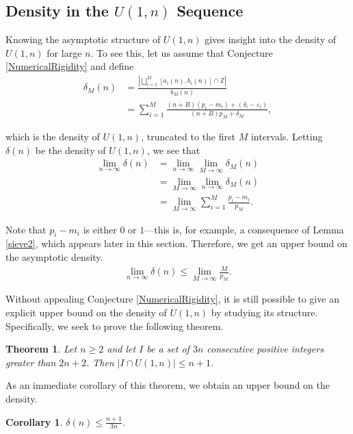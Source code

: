 \documentclass{amsart}
\newcommand{\ZZ}{\mathbb{Z}}
\theoremstyle{theorem}
\newtheorem{theorem}{Theorem}[section]
\newtheorem{corollary}{Corollary}[section]
\theoremstyle{definition}
\begin{document}
\subsection{Density in the $U(1,n)$ Sequence} Knowing the asymptotic structure of $U(1,n)$ gives insight into the density of $U(1,n)$ for large $n$. To see this, let us assume that Conjecture \ref{NumericalRigidity} and define
	\begin{align*}
    \delta_M(n) &= \frac{\left|\bigsqcup_{i = 1}^M [a_i(n), b_i(n)] \cap \ZZ\right|}{b_M(n)} \\
    &= \sum_{i = 1}^M \frac{(n + B)(p_i - m_i) + (\delta_i - \varepsilon_i)}{(n + B)p_M + \delta_M},
    \end{align*}
    
\noindent which is the density of $U(1,n)$, truncated to the first $M$ intervals. Letting $\delta(n)$ be the density of $U(1,n)$, we see that
	\begin{align*}
    \lim_{n \rightarrow \infty} \delta(n) &= \lim_{n \rightarrow \infty}\lim_{M \rightarrow \infty} \delta_M(n) \\
    &= \lim_{M \rightarrow \infty}\lim_{n \rightarrow \infty} \delta_M(n) \\
    &= \lim_{M \rightarrow \infty}\sum_{i = 1}^M \frac{p_i - m_i}{p_M}.
    \end{align*}


\noindent Note that $p_i - m_i$ is either $0$ or $1$---this is, for example, a consequence of Lemma \ref{sieve2}, which appears later in this section. Therefore, we get an upper bound on the asymptotic density.
	\begin{align*}
    \lim\limits_{n\to\infty}\delta(n)\leq\lim\limits_{M\to\infty}\frac{M}{p_M}.
    \end{align*}

\noindent Without appealing Conjecture \ref{NumericalRigidity}, it is still possible to give an explicit upper bound on the density of $U(1,n)$ by studying its structure. Specifically, we seek to prove the following theorem.

\begin{theorem}\label{upper bound}
Let $n \geq 2$ and let $I$ be a set of $3n$ consecutive positive integers greater than $2n + 2$. Then $|I\cap U(1,n)|\leq n + 1$.
\end{theorem}

As an immediate corollary of this theorem, we obtain an upper bound on the density.

\begin{corollary}\label{ExplicitUpperBound}
$\delta(n) \leq \frac{n+1}{3n}$.
\end{corollary}
\end{document}
